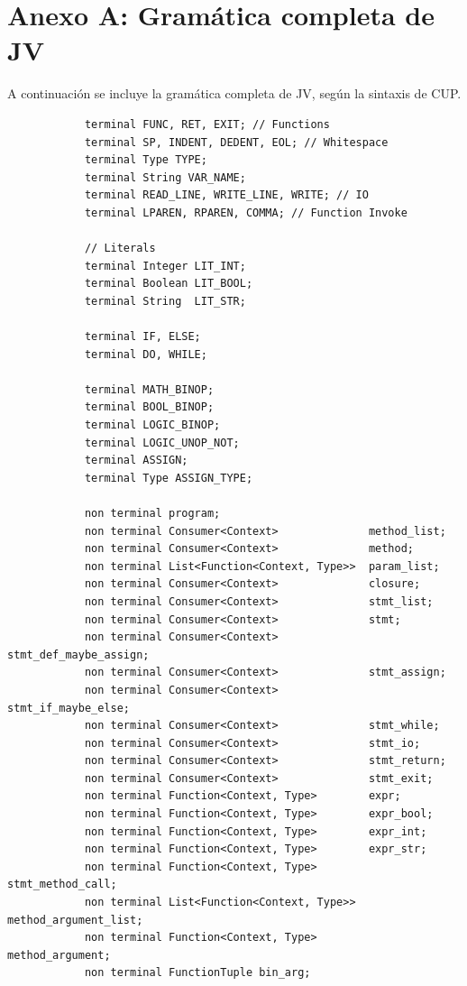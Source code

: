 \documentclass{article}
\begin{document}
    \section{Anexo A: Gramática completa de JV}
        \par A continuación se incluye la gramática completa de JV, según la sintaxis de CUP.
        \\
        \begin{lstlisting}
            terminal FUNC, RET, EXIT; // Functions
            terminal SP, INDENT, DEDENT, EOL; // Whitespace
            terminal Type TYPE;
            terminal String VAR_NAME;
            terminal READ_LINE, WRITE_LINE, WRITE; // IO
            terminal LPAREN, RPAREN, COMMA; // Function Invoke
            
            // Literals
            terminal Integer LIT_INT;
            terminal Boolean LIT_BOOL;
            terminal String  LIT_STR;
            
            terminal IF, ELSE;
            terminal DO, WHILE;
            
            terminal MATH_BINOP;
            terminal BOOL_BINOP;
            terminal LOGIC_BINOP;
            terminal LOGIC_UNOP_NOT;
            terminal ASSIGN;
            terminal Type ASSIGN_TYPE;
            
            non terminal program;
            non terminal Consumer<Context>              method_list;
            non terminal Consumer<Context>              method;
            non terminal List<Function<Context, Type>>  param_list;
            non terminal Consumer<Context>              closure;
            non terminal Consumer<Context>              stmt_list;
            non terminal Consumer<Context>              stmt;
            non terminal Consumer<Context>              stmt_def_maybe_assign;
            non terminal Consumer<Context>              stmt_assign;
            non terminal Consumer<Context>              stmt_if_maybe_else;
            non terminal Consumer<Context>              stmt_while;
            non terminal Consumer<Context>              stmt_io;
            non terminal Consumer<Context>              stmt_return;
            non terminal Consumer<Context>              stmt_exit;
            non terminal Function<Context, Type>        expr;
            non terminal Function<Context, Type>        expr_bool;
            non terminal Function<Context, Type>        expr_int;
            non terminal Function<Context, Type>        expr_str;
            non terminal Function<Context, Type>        stmt_method_call;
            non terminal List<Function<Context, Type>>  method_argument_list;
            non terminal Function<Context, Type>        method_argument;
            non terminal FunctionTuple bin_arg;
            

\end{lstlisting}
\end{document}

